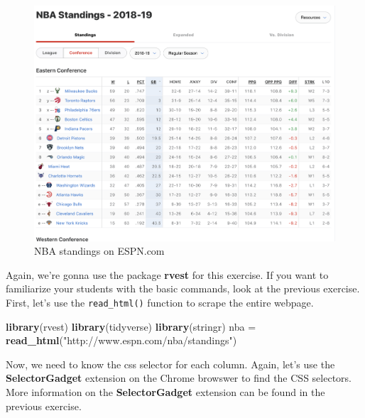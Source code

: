 \documentclass[]{book}
\newenvironment{Shaded}{\begin{snugshade}}{\end{snugshade}}
\newcommand{\KeywordTok}[1]{\textcolor[rgb]{0.13,0.29,0.53}{\textbf{#1}}}
\newcommand{\NormalTok}[1]{#1}
\newcommand{\StringTok}[1]{\textcolor[rgb]{0.31,0.60,0.02}{#1}}
\begin{document}
\begin{figure}
\centering
\includegraphics{./images/nba_espn.png}
\caption{NBA standings on ESPN.com}
\end{figure}

Again, we're gonna use the package \textbf{rvest} for this exercise. If you want to familiarize your students with the basic commands, look at the previous exercise. First, let's use the \texttt{read\_html()} function to scrape the entire webpage.

\begin{Shaded}
\begin{Highlighting}[]
\KeywordTok{library}\NormalTok{(rvest)}
\KeywordTok{library}\NormalTok{(tidyverse)}
\KeywordTok{library}\NormalTok{(stringr)}
\NormalTok{nba =}\StringTok{ }\KeywordTok{read_html}\NormalTok{(}\StringTok{"http://www.espn.com/nba/standings"}\NormalTok{)}
\end{Highlighting}
\end{Shaded}

Now, we need to know the css selector for each column. Again, let's use the \textbf{SelectorGadget} extension on the Chrome browswer to find the CSS selectors. More information on the \textbf{SelectorGadget} extension can be found in the previous exercise.
\end{document}

